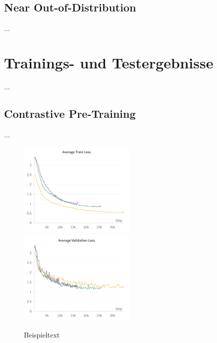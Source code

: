\subsection{Near Out-of-Distribution} \label{sec:da-fusion-ood-results}


...

\section{Trainings- und Testergebnisse} \label{sec:supcon-results}

...

\subsection{Contrastive Pre-Training} \label{sec:supcon-pre-results}

...

\begin{figure}
	\centering
	\includegraphics[width=0.5\textwidth]{figure_results_supcon-pre_avg-train-loss.png}%
	\includegraphics[width=0.5\textwidth]{figure_results_supcon-pre_avg-val-loss.png}
	\caption{Beispieltext}
	\label{fig:supcon-pre-loss}
\end{figure}

